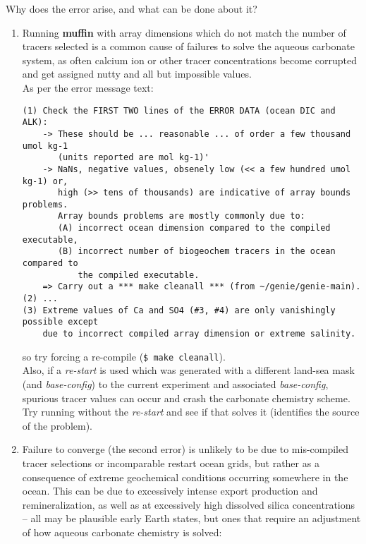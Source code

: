 \documentclass[11pt,fleqn]{book} %
\begin{document}
Why does the error arise, and what can be done about it?

\begin{enumerate}[noitemsep]

\vspace{2mm}
\item 
Running \textbf{muffin} with array dimensions which do not match the number of tracers selected is a common cause of failures to solve the aqueous carbonate system, as often calcium ion or other tracer concentrations become corrupted and get assigned nutty and all but impossible values. 
\\As per the error message text:
\small\begin{verbatim}
(1) Check the FIRST TWO lines of the ERROR DATA (ocean DIC and ALK):
    -> These should be ... reasonable ... of order a few thousand umol kg-1
       (units reported are mol kg-1)'
    -> NaNs, negative values, obsenely low (<< a few hundred umol kg-1) or,
       high (>> tens of thousands) are indicative of array bounds problems.
       Array bounds problems are mostly commonly due to:
       (A) incorrect ocean dimension compared to the compiled executable,
       (B) incorrect number of biogeochem tracers in the ocean compared to
           the compiled executable.
    => Carry out a *** make cleanall *** (from ~/genie/genie-main). 
(2) ...
(3) Extreme values of Ca and SO4 (#3, #4) are only vanishingly possible except
    due to incorrect compiled array dimension or extreme salinity.
\end{verbatim}\normalsize
so try forcing a re-compile (\texttt{\$ make cleanall}).
\\Also, if a \textit{re-start} is used which was generated with a different land-sea mask (and \textit{base-config}) to the current experiment and associated \textit{base-config}, spurious tracer values can occur and crash the carbonate chemistry scheme. Try running without the \textit{re-start} and see if that solves it (identifies the source of the problem).

\vspace{2mm}
\item Failure to converge (the second error) is unlikely to be due to mis-compiled tracer selections or incomparable restart ocean grids, but rather as a consequence of extreme geochemical conditions occurring somewhere in the ocean. This can be due to excessively intense export production and remineralization, as well as at excessively high dissolved silica concentrations -- all may be plausible early Earth states, but ones that require an adjustment of how aqueous carbonate chemistry is solved:


\end{enumerate}
\end{document}
